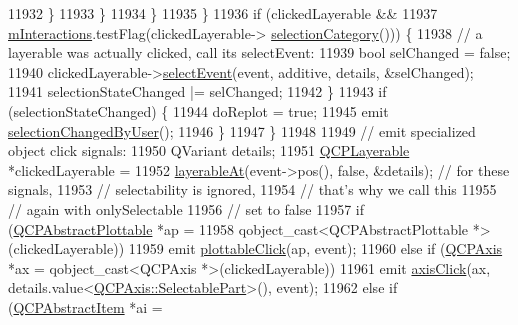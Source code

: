 \begin{DoxyCode}
11932             \}
11933           \}
11934         \}
11935       \}
11936       \textcolor{keywordflow}{if} (clickedLayerable &&
11937           \hyperlink{class_q_custom_plot_ad717377ceba7493b4b32f0bcbbdf1895}{mInteractions}.testFlag(clickedLayerable->
      \hyperlink{class_q_c_p_layerable_aa4035e586b7f317a06ba7e74e242a5ea}{selectionCategory}())) \{
11938         \textcolor{comment}{// a layerable was actually clicked, call its selectEvent:}
11939         \textcolor{keywordtype}{bool} selChanged = \textcolor{keyword}{false};
11940         clickedLayerable->\hyperlink{class_q_c_p_layerable_a7498c2d0d081cf7cad0fb3bb93aa0e91}{selectEvent}(event, additive, details, &selChanged);
11941         selectionStateChanged |= selChanged;
11942       \}
11943       \textcolor{keywordflow}{if} (selectionStateChanged) \{
11944         doReplot = \textcolor{keyword}{true};
11945         emit \hyperlink{class_q_custom_plot_a500c64a109bc773c973ad274f2fa4190}{selectionChangedByUser}();
11946       \}
11947     \}
11948 
11949     \textcolor{comment}{// emit specialized object click signals:}
11950     QVariant details;
11951     \hyperlink{class_q_c_p_layerable}{QCPLayerable} *clickedLayerable =
11952         \hyperlink{class_q_custom_plot_a3fffd1d8364f657482ae985e0b5aa028}{layerableAt}(event->pos(), \textcolor{keyword}{false}, &details); \textcolor{comment}{// for these signals,}
11953                                                     \textcolor{comment}{// selectability is ignored,}
11954                                                     \textcolor{comment}{// that's why we call this}
11955                                                     \textcolor{comment}{// again with onlySelectable}
11956                                                     \textcolor{comment}{// set to false}
11957     \textcolor{keywordflow}{if} (\hyperlink{class_q_c_p_abstract_plottable}{QCPAbstractPlottable} *ap =
11958             qobject\_cast<QCPAbstractPlottable *>(clickedLayerable))
11959       emit \hyperlink{class_q_custom_plot_a57e5efa8a854620e9bf62d31fc139f53}{plottableClick}(ap, event);
11960     \textcolor{keywordflow}{else} \textcolor{keywordflow}{if} (\hyperlink{class_q_c_p_axis}{QCPAxis} *ax = qobject\_cast<QCPAxis *>(clickedLayerable))
11961       emit \hyperlink{class_q_custom_plot_abf635f8b56ab5c16d5de9f358543e82b}{axisClick}(ax, details.value<\hyperlink{class_q_c_p_axis_abee4c7a54c468b1385dfce2c898b115f}{QCPAxis::SelectablePart}>(), event);
11962     \textcolor{keywordflow}{else} \textcolor{keywordflow}{if} (\hyperlink{class_q_c_p_abstract_item}{QCPAbstractItem} *ai =

\end{DoxyCode}
